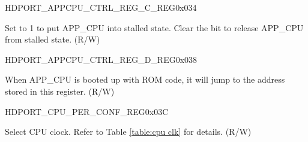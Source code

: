\begin{register}{H}{DPORT\_APPCPU\_CTRL\_REG\_C\_REG}{0x034}\label{regdesc:APPCPUCTRLREGCREG}
%
%
\regnewline%
\begin{regdesc}\begin{reglist}
\item [DPORT\_APPCPU\_RUNSTALL] Set to 1 to put APP\_CPU into stalled state. Clear the bit to release APP\_CPU from stalled state. (R/W)
\end{reglist}\end{regdesc}
\end{register}


\begin{register}{H}{DPORT\_APPCPU\_CTRL\_REG\_D\_REG}{0x038}\label{regdesc:APPCPUCTRLREGDREG}
%
\regnewline%
\begin{regdesc}\begin{reglist}
\item [DPORT\_APPCPU\_CTRL\_REG\_D\_REG]When APP\_CPU is booted up with ROM code, it will jump to the address stored in this register. (R/W)
\end{reglist}\end{regdesc}
\end{register}


\begin{register}{H}{DPORT\_CPU\_PER\_CONF\_REG}{0x03C}\label{regdesc:CPUPERCONFREG}
%
%
\regnewline%
\begin{regdesc}\begin{reglist}
\label{fielddesc:CPUCPUPERIODSEL}
\item [DPORT\_CPU\_CPUPERIOD\_SEL] Select CPU clock. Refer to Table \ref{table:cpu clk} for details. (R/W)
\end{reglist}\end{regdesc}
\end{register}


